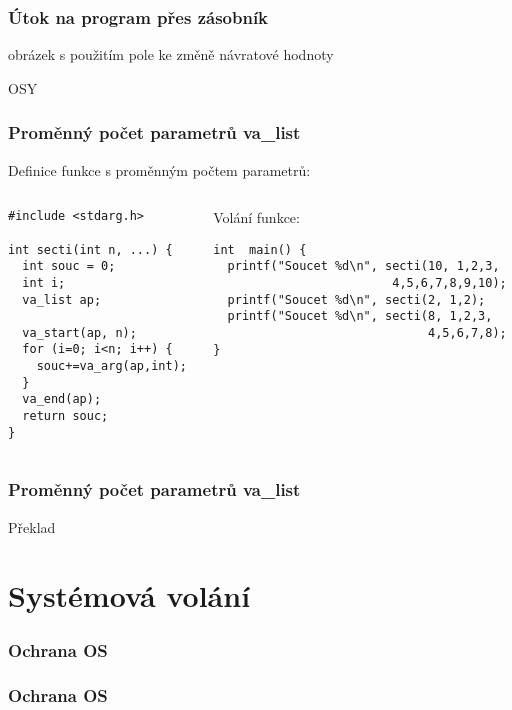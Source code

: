 \documentclass{beamer}
\begin{document}
\begin{frame}
\frametitle{Útok na program přes zásobník}

obrázek s použitím pole ke změně návratové hodnoty

OSY

\end{frame}



\begin{frame}[fragile]
\frametitle{Proměnný počet parametrů va\_list}

Definice funkce s proměnným počtem parametrů:

\begin{columns}
\begin{column}{0.4\textwidth}
\begin{verbatim}
#include <stdarg.h>

int secti(int n, ...) {
  int souc = 0;
  int i;
  va_list ap;
  
  va_start(ap, n);
  for (i=0; i<n; i++) {
    souc+=va_arg(ap,int);
  }
  va_end(ap);
  return souc;
}
\end{verbatim}
\end{column}   
\begin{column}{0.6\textwidth}
Volání funkce:

\begin{verbatim}
int  main() {
  printf("Soucet %d\n", secti(10, 1,2,3,
                         4,5,6,7,8,9,10);
  printf("Soucet %d\n", secti(2, 1,2);
  printf("Soucet %d\n", secti(8, 1,2,3,
                              4,5,6,7,8);
}
\end{verbatim}
\end{column}
\end{columns}

\end{frame}

\begin{frame}
\frametitle{Proměnný počet parametrů va\_list}

Překlad

\end{frame}


\section {Systémová volání}

\begin{frame}
\frametitle{Ochrana OS}


\end{frame}

\begin{frame}
\frametitle{Ochrana OS}


\end{frame}
\end{document}
